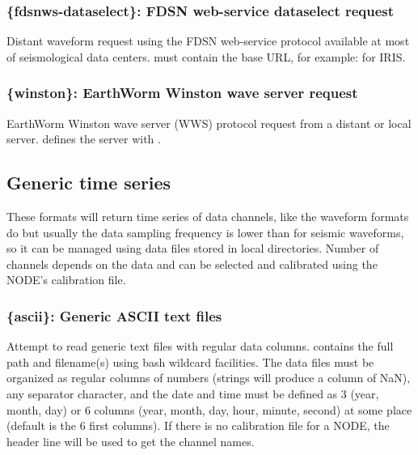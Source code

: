 \subsubsection{\{fdsnws-dataselect\}: FDSN web-service dataselect request}

Distant waveform request using the FDSN web-service protocol available at most of seismological data centers.  must contain the base URL, for example:  for IRIS.

\subsubsection{\{winston\}: EarthWorm Winston wave server request}

EarthWorm Winston wave server (WWS) protocol request from a distant or local server.  defines the server with .


\subsection{Generic time series}
\label{timeseries}

These formats will return time series of data channels, like the waveform formats do but usually the data sampling frequency is lower than for seismic waveforms, so it can be managed using data files stored in local directories. Number of channels depends on the data and can be selected and calibrated using the NODE's calibration file.

\subsubsection{\{ascii\}: Generic ASCII text files}

Attempt to read generic text files with regular data columns.  contains the full path and filename(s) using bash wildcard facilities. The data files must be organized as regular columns of numbers (strings will produce a column of NaN), any separator character, and the date and time must be defined as 3 (year, month, day) or 6 columns (year, month, day, hour, minute, second) at some place (default is the 6 first columns). If there is no calibration file for a NODE, the header line will be used to get the channel names.

